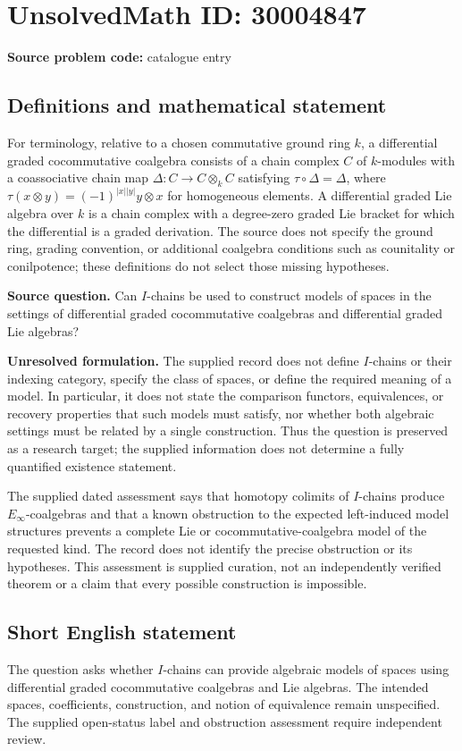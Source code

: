 \documentclass[11pt]{article}
\begin{document}
\section*{UnsolvedMath ID: 30004847}
\textbf{Source problem code:} catalogue entry
\subsection{Definitions and mathematical statement}
For terminology, relative to a chosen commutative ground ring \(k\), a differential graded cocommutative coalgebra consists of a chain complex \(C\) of \(k\)-modules with a coassociative chain map \(\Delta:C\to C\otimes_k C\) satisfying \(\tau\circ\Delta=\Delta\), where \(\tau(x\otimes y)=(-1)^{|x||y|}y\otimes x\) for homogeneous elements. A differential graded Lie algebra over \(k\) is a chain complex with a degree-zero graded Lie bracket for which the differential is a graded derivation. The source does not specify the ground ring, grading convention, or additional coalgebra conditions such as counitality or conilpotence; these definitions do not select those missing hypotheses.

\textbf{Source question.} Can \(I\)-chains be used to construct models of spaces in the settings of differential graded cocommutative coalgebras and differential graded Lie algebras?

\textbf{Unresolved formulation.} The supplied record does not define \(I\)-chains or their indexing category, specify the class of spaces, or define the required meaning of a model. In particular, it does not state the comparison functors, equivalences, or recovery properties that such models must satisfy, nor whether both algebraic settings must be related by a single construction. Thus the question is preserved as a research target; the supplied information does not determine a fully quantified existence statement.

The supplied dated assessment says that homotopy colimits of \(I\)-chains produce \(E_\infty\)-coalgebras and that a known obstruction to the expected left-induced model structures prevents a complete Lie or cocommutative-coalgebra model of the requested kind. The record does not identify the precise obstruction or its hypotheses. This assessment is supplied curation, not an independently verified theorem or a claim that every possible construction is impossible.
\subsection{Short English statement}
The question asks whether \(I\)-chains can provide algebraic models of spaces using differential graded cocommutative coalgebras and Lie algebras. The intended spaces, coefficients, construction, and notion of equivalence remain unspecified. The supplied open-status label and obstruction assessment require independent review.
\end{document}
